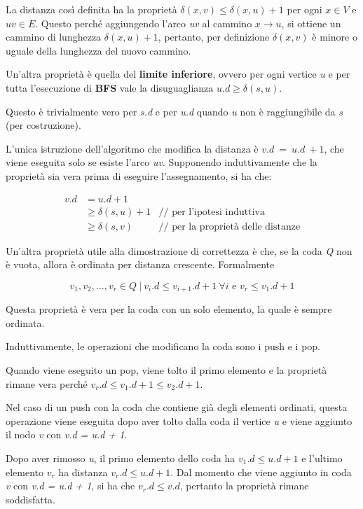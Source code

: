 La distanza così definita ha la proprietà $\delta(x,v) \leq \delta(x,u) + 1$ per ogni $x \in V$ e $uv \in E$. 
Questo perché aggiungendo l'arco \emph{uv} al cammino $ x \rightarrow u$, si ottiene un cammino di
lunghezza $\delta(x,u) + 1$, pertanto, per definizione $\delta(x,v)$ è
minore o uguale della lunghezza del nuovo cammino.

Un'altra proprietà è quella del \textbf{limite inferiore}, ovvero per
ogni vertice \emph{u} e per tutta l'esecuzione di \textbf{BFS} vale la
disuguaglianza $u.d \geq \delta(s,u)$.

Questo è trivialmente vero per \emph{s.d} e per \emph{u.d} quando \emph{u} non è raggiungibile da \emph{s} (per costruzione).

L'unica istruzione dell'algoritmo che modifica la distanza è
$v.d\ =\ u.d\ + 1$, che viene eseguita solo se esiste l'arco
\emph{uv}. Supponendo induttivamente che la proprietà sia vera prima di
eseguire l'assegnamento, si ha che:

\begin{align*}
v.d &= u.d + 1 &\\
     &\geq \delta(s,u) + 1 & \text{// per l'ipotesi induttiva }\\
     &\geq \delta(s,v)   & \text{// per la proprietà delle distanze}
\end{align*}

Un'altra proprietà utile alla dimostrazione di correttezza è che, se la
coda \emph{Q} non è vuota, allora è ordinata per distanza crescente.
Formalmente

$$
v_1, v_2, \ldots, v_r \in Q \: | \:  v_i.d \leq v_{i+1}.d + 1 \: \forall i  \text{ e } v_r \leq v_1.d +1
$$

Questa proprietà è vera per la coda con un solo elemento, la quale è
sempre ordinata.

Induttivamente, le operazioni che modificano la coda sono i push e i
pop.

Quando viene eseguito un pop, viene tolto il primo elemento e la
proprietà rimane vera perché $v_r.d \leq v_1.d + 1 \leq v_2.d + 1$.

Nel caso di un push con la coda che contiene già degli elementi
ordinati, questa operazione viene eseguita dopo aver tolto dalla coda il
vertice \emph{u} e viene aggiunto il nodo \emph{v} con \emph{v.d = u.d +
1}.

Dopo aver rimosso \emph{u}, il primo elemento dello coda ha  $v_1.d \leq u.d + 1$ e l'ultimo elemento $v_r$ ha distanza
$v_r.d \leq u.d +1$. Dal momento che viene aggiunto in
coda \emph{v} con \emph{v.d = u.d + 1}, si ha che $v_r.d \leq v.d$, pertanto la proprietà rimane soddisfatta.
